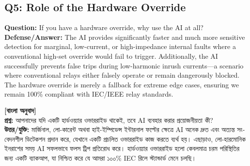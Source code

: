 \documentclass[12pt]{article}
\begin{document}
\subsection*{Q5: Role of the Hardware Override}
\textbf{Question:} If you have a hardware override, why use the AI at all? \\
\textbf{Defense/Answer:} The AI provides significantly faster and much more sensitive detection for marginal, low-current, or high-impedance internal faults where a conventional high-set override would fail to trigger. Additionally, the AI successfully prevents false trips during low-harmonic inrush currents—a scenario where conventional relays either falsely operate or remain dangerously blocked. The hardware override is merely a fallback for extreme edge cases, ensuring we remain 100\% compliant with IEC/IEEE relay standards.

\begin{bengali}
\textbf{[বাংলা অনুবাদ]} \\
\textbf{প্রশ্ন:} আপনাদের যদি একটি হার্ডওয়্যার ওভাররাইড থাকেই, তবে AI ব্যবহার করার প্রয়োজনীয়তা কী? \\
\textbf{উত্তর/যুক্তি:} মার্জিনাল, লো-কারেন্ট অথবা হাই-ইম্পিডেন্স ইন্টারনাল ফল্টের ক্ষেত্রে AI অনেক দ্রুত এবং অত্যন্ত সংবেদনশীল ডিটেকশন প্রদান করে, যেখানে একটি প্রচলিত ওভাররাইড কাজ করতে ব্যর্থ হয়। এছাড়াও, লো-হারমোনিক ইনরাশের সময় AI সফলভাবে ফলস ট্রিপ প্রতিরোধ করে। হার্ডওয়্যার ওভাররাইড হলো কেবলমাত্র চরম পরিস্থিতির জন্য একটি ব্যাকআপ, যা নিশ্চিত করে যে আমরা ১০০\% IEC রিলে স্ট্যান্ডার্ড মেনে চলছি।
\end{bengali}
\end{document}
